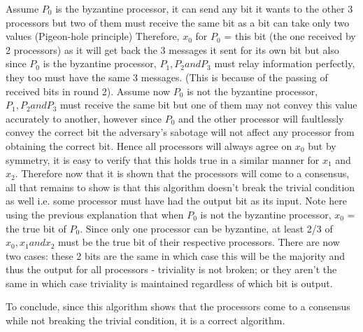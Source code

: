 \documentclass[11pt]{article}
\begin{document}
Assume $P_0$ is the byzantine processor, it can send any bit it wants to the other 3 processors but two of them must receive the same bit as a bit can take only two values (Pigeon-hole principle)
Therefore, $x_0$ for $P_0$ = this bit (the one received by 2 processors) as it will get back the 3 messages it sent for its own bit but also since $P_0$ is the byzantine processor, $P_1, P_2 and P_3$ must relay information perfectly, they too must have the same 3 messages. (This is because of the passing of received bits in round 2).\newline
Assume now $P_0$ is not the byzantine processor, $P_1, P_2 and P_3$ must receive the same bit but one of them may not convey this value accurately to another, however since $P_0$ and the other processor will faultlessly convey the correct bit the adversary's sabotage will not affect any processor from obtaining the correct bit.
\newline
Hence all processors will always agree on $x_0$ but by symmetry, it is easy to verify that this holds true in a similar manner for $x_1$ and $x_2$. 
\newline
Therefore now that it is shown that the processors will come to a consensus, all that remains to show is that this algorithm doesn't break the trivial condition as well i.e. some processor must have had the output bit as its input. Note here using the previous explanation that when $P_0$ is not the byzantine processor, $x_0$ = the true bit of $P_0$. Since only one processor can be byzantine, at least 2/3 of $x_0, x_1 and x_2$ must be the true bit of their respective processors. There are now two cases: these 2 bits are the same in which case this will be the majority and thus the output for all processors - triviality is not broken; or they aren't the same in which case triviality is maintained regardless of which bit is output. 
\newline

To conclude, since this algorithm shows that the processors come to a consensus while not breaking the trivial condition, it is a correct algorithm. 
\end{document}
